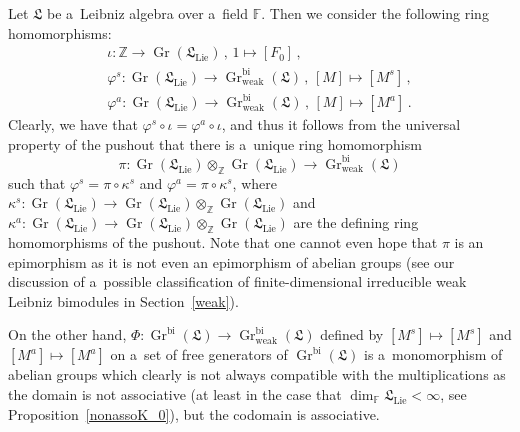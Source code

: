 \documentclass{jonasart}
\DeclareMathOperator{\bi}{bi}
\DeclareMathOperator{\K}{Gr}
\DeclareMathOperator{\lie}{Lie}
\DeclareMathOperator{\weak}{weak}
\newcommand{\fbb}{\mathbb{F}}
\newcommand{\lf}{\mathfrak{L}}
\newcommand{\zbb}{\mathbb{Z}}
\begin{document}
	Let $\lf$ be a~Leibniz algebra over a~field $\fbb$. Then we consider the following ring homomorphisms:
	\begin{gather*}
		\iota:\zbb\to\K(\lf_{\lie})\,,\,1\mapsto[F_0 ]\,, \\
		\varphi^s:\K(\lf_{\lie})\to\K_{\weak}^{\bi}(\lf)\,,\,[M]\mapsto[M^s ]\,, \\
		\varphi^a:\K(\lf_{\lie})\to\K_{\weak}^{\bi}(\lf)\,,\,[M]\mapsto[M^a ]\,.
	\end{gather*}
	Clearly, we have that $\varphi^s\circ\iota=\varphi^a\circ\iota$, and thus it follows from the universal property of the pushout that there is a~unique ring homomorphism
	\[
		\pi:\K(\lf_{\lie})\otimes_\zbb\K(\lf_{\lie})\to\K_{\weak}^{\bi}(\lf)
	\]
	such that $\varphi^s =\pi\circ\kappa^s$ and $\varphi^a
	=\pi\circ\kappa^s$, where $\kappa^s:\K(\lf_{\lie})\to\K(\lf_{\lie})
	\otimes_\zbb\K(\lf_{\lie})$ and $\kappa^a:\K(\lf_{\lie})\to\K(\lf_{\lie})
	\otimes_\zbb\K(\lf_{\lie})$ are the defining ring homomorphisms of the pushout. Note that one cannot even hope that $\pi$ is an epimorphism as it is not even an epimorphism of abelian groups
	(see our discussion of a~possible classification of finite-dimensional irreducible weak Leibniz bimodules in Section~\ref{weak}).

	On the other hand, $\Phi:\K^{\bi}(\lf)\to\K_{\weak}^{\bi}(\lf)$ defined by $[M^s ]\mapsto[M^s ]$ and $[M^a ]\mapsto[M^a ]$ on a~set of free generators of $\K^{\bi}(\lf)$ is a~monomorphism of abelian groups which clearly is not always compatible with the multiplications as the domain is not associative (at least in the case that $\dim_\fbb\lf_{\lie}
	<\infty$, see Proposition~\ref{nonassoK_0}), but the codomain is associative.
\end{document}
